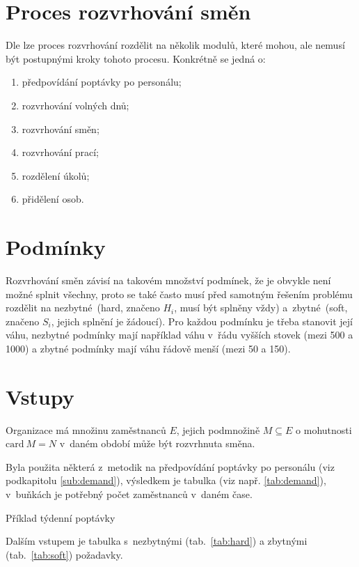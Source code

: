 \documentclass[twoside]{ctuthesis}
\begin{document}
\section{Proces rozvrhování směn}
Dle \cite{ernst2004staff} lze proces rozvrhování rozdělit na několik modulů, které mohou, ale nemusí být postupnými kroky tohoto procesu. Konkrétně se jedná o:
\begin{enumerate}
	\item předpovídání poptávky po personálu;
	\item rozvrhování volných dnů;
	\item rozvrhování směn;
	\item rozvrhování prací;
	\item rozdělení úkolů;
	\item přidělení osob.
\end{enumerate}

\section{Podmínky}
Rozvrhování směn závisí na takovém množství podmínek, že je obvykle není možné splnit všechny, proto se také často musí před samotným řešením problému rozdělit na nezbytné~(hard, značeno $H_i$, musí být splněny vždy) a~zbytné~(soft, značeno $S_i$, jejich splnění je žádoucí). \cite{todorovic2012bee} Pro každou podmínku je třeba stanovit její váhu, nezbytné podmínky mají například váhu v~řádu vyšších stovek (mezi 500 a 1000) a zbytné podmínky mají váhu řádově menší (mezi 50 a 150). \cite{buyukozkan2014applicability}


\section{Vstupy}
Organizace má množinu zaměstnanců $E$, jejich podmnožině $M \subseteq E$ o mohutnosti $\mbox{card}~M = N$ v~daném období může být rozvrhnuta směna.

Byla použita některá z~metodik na předpovídání poptávky po personálu (viz podkapitolu \ref{sub:demand}), výsledkem je tabulka (viz např. \ref{tab:demand}), v~buňkách je potřebný počet zaměstnanců v~daném čase.

\begin{table}[h]
	
	\caption{Příklad týdenní poptávky}
	\label{tab:demand}
\end{table}

Dalším vstupem je tabulka s~nezbytnými (tab.~\ref{tab:hard}) a zbytnými (tab.~\ref{tab:soft}) požadavky.
\end{document}
